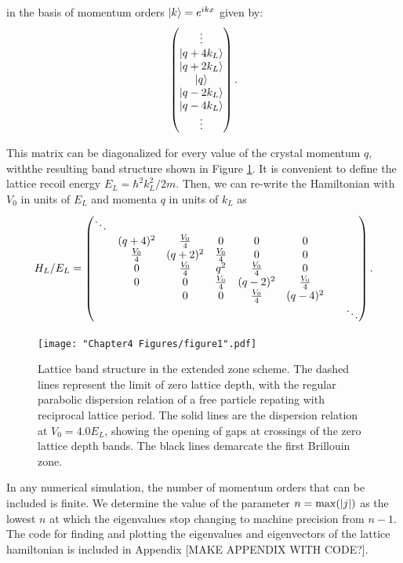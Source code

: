 in the basis of momentum orders $\mathinner{|{k}\rangle}=e^{i k x}$ given by:
\begin{equation}
 \begin{pmatrix} \vdots \\
\mathinner{|{q+4 k_L}\rangle}\\
\mathinner{|{q+2 k_L}\rangle}\\
\mathinner{|{q}\rangle}\\
\mathinner{|{q -2 k_L}\rangle}\\
\mathinner{|{q - 4 k_L}\rangle}\\
\vdots
\end{pmatrix} \\.
\end{equation}

This matrix can be diagonalized for every value of the crystal momentum $q$, withthe resulting band structure shown in Figure \ref{fig:latticeBandStructure}. It is convenient to define the lattice recoil energy $E_L = \hbar^2 k_L^2/2m$. Then, we can re-write the Hamiltonian with $V_0$ in units of $E_L$ and momenta $q$ in units of $k_L$ as 
\begin{equation}
H_L/E_L =
 \begin{pmatrix} \ddots &  & & & & & & \\ 
 & (q + 4)^2 & \frac{V_0}{4} & 0 & 0 & 0 &  \\
 & \frac{V_0}{4} &(q + 2)^2 & \frac{V_0}{4} & 0 & 0 &  \\
& 0 & \frac{V_0}{4} & q^2 & \frac{V_0}{4} & 0 &  \\
 & 0 & 0 & \frac{V_0}{4} & (q - 2)^2 &\frac{V_0}{4} &  \\
 &  & 0 & 0 & \frac{V_0}{4} & (q  - 4)^2 &  \\
& & & & & & &  \ddots \end{pmatrix} \\.
\end{equation}

\begin{figure}
	\texttt{[image: "Chapter4 Figures/figure1".pdf]}
\caption{Lattice band structure in the extended zone scheme. The dashed lines represent the limit of zero lattice depth, with the regular parabolic dispersion relation of a free particle repating with reciprocal lattice period. The solid lines are the dispersion relation at $V_0 = 4.0 E_L$, showing the opening of gaps at crossings of the zero lattice depth bands. The black lines demarcate the first Brillouin zone. }
\label{fig:latticeBandStructure}
\end{figure}

In any numerical simulation, the number of momentum orders that can be included is finite. We determine the value of the parameter $n = {\rm max}(|j|)$ as the lowest $n$ at which the eigenvalues stop changing to machine precision from $n-1$. The code for finding and plotting the eigenvalues and eigenvectors of the lattice hamiltonian is included in Appendix [MAKE APPENDIX WITH CODE?].

